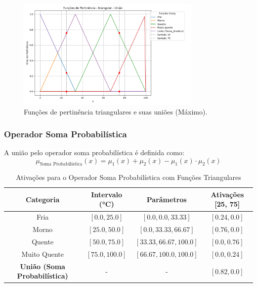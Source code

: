 \documentclass[a4paper,12pt]{article}
\begin{document}
\begin{figure}[H]
    \centering
    \includegraphics[width=0.8\textwidth]{img/funções_de_pertinência_triangular_união_fuzzificado.png}
    \caption{Funções de pertinência triangulares e suas uniões (Máximo).}
    \label{fig:uniao_maximo_triangular}
\end{figure}

\subsubsection{Operador Soma Probabilística}

A união pelo operador soma probabilística é definida como:
\[
\mu_{\text{Soma Probabilística}}(x) = \mu_1(x) + \mu_2(x) - \mu_1(x) \cdot \mu_2(x)
\]

\begin{table}[H]
\centering
\caption{Ativações para o Operador Soma Probabilística com Funções Triangulares}
\begin{tabular}{|c|c|c|c|}
\hline
\textbf{Categoria}    & \textbf{Intervalo (°C)} & \textbf{Parâmetros}       & \textbf{Ativações [25, 75]} \\ \hline
Fria                  & $[0.0, 25.0]$          & $[0.0, 0.0, 33.33]$       & $[0.24, 0.0]$              \\ \hline
Morno                 & $[25.0, 50.0]$         & $[0.0, 33.33, 66.67]$     & $[0.76, 0.0]$              \\ \hline
Quente                & $[50.0, 75.0]$         & $[33.33, 66.67, 100.0]$   & $[0.0, 0.76]$              \\ \hline
Muito Quente          & $[75.0, 100.0]$        & $[66.67, 100.0, 100.0]$   & $[0.0, 0.24]$              \\ \hline
\textbf{União (Soma Probabilística)} & -       & -                         & $[0.82, 0.0]$             \\ \hline
\end{tabular}
\end{table}
\end{document}

